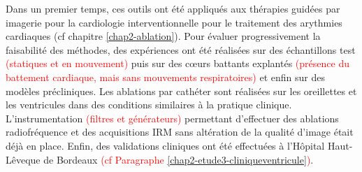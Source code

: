 Dans un premier temps, ces outils ont été appliqués aux thérapies guidées par imagerie pour la cardiologie interventionnelle pour le traitement des arythmies cardiaques (cf chapitre \ref{chap2-ablation}). Pour évaluer progressivement la faisabilité des méthodes, des expériences ont été réalisées sur des échantillons test \textcolor{red}{(statiques et en mouvement)} puis sur des cœurs battants explantés \textcolor{red}{(présence du battement cardiaque, mais sans mouvements respiratoires)} et enfin sur des modèles précliniques. Les ablations par cathéter sont réalisées sur les oreillettes et les ventricules dans des conditions similaires à la pratique clinique. L’instrumentation \textcolor{red}{(filtres et générateurs)} permettant d’effectuer des ablations radiofréquence et des acquisitions IRM sans altération de la qualité d’image était déjà en place. Enfin, des validations cliniques ont été effectuées à l’Hôpital Haut-Lêveque de Bordeaux \textcolor{red}{(cf Paragraphe \ref{chap2-etude3-cliniqueventricule})}.\\